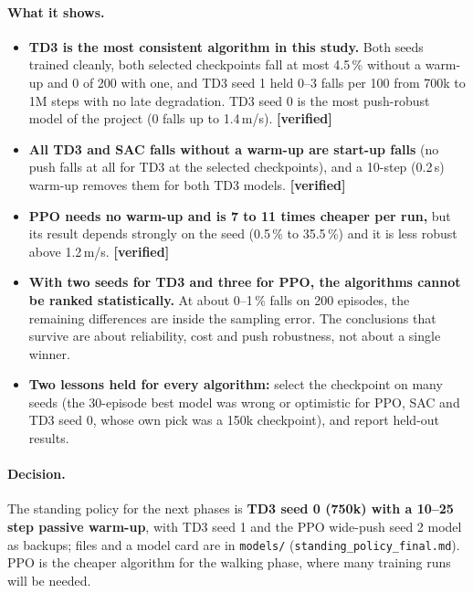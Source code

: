 \documentclass[11pt,a4paper]{article}
\newcommand{\tagv}{\textbf{[verified]}}
\begin{document}
\paragraph{What it shows.}
\begin{itemize}
\item \textbf{TD3 is the most consistent algorithm in this study.} Both seeds trained cleanly, both selected checkpoints fall at most 4.5\,\% without a warm-up and 0 of 200 with one, and TD3 seed 1 held 0--3 falls per 100 from 700k to 1M steps with no late degradation. TD3 seed 0 is the most push-robust model of the project (0 falls up to 1.4\,m/s). \tagv
\item \textbf{All TD3 and SAC falls without a warm-up are start-up falls} (no push falls at all for TD3 at the selected checkpoints), and a 10-step (0.2\,s) warm-up removes them for both TD3 models. \tagv
\item \textbf{PPO needs no warm-up and is 7 to 11 times cheaper per run,} but its result depends strongly on the seed (0.5\,\% to 35.5\,\%) and it is less robust above 1.2\,m/s. \tagv
\item \textbf{With two seeds for TD3 and three for PPO, the algorithms cannot be ranked statistically.} At about 0--1\,\% falls on 200 episodes, the remaining differences are inside the sampling error. The conclusions that survive are about reliability, cost and push robustness, not about a single winner.
\item \textbf{Two lessons held for every algorithm:} select the checkpoint on many seeds (the 30-episode best model was wrong or optimistic for PPO, SAC and TD3 seed 0, whose own pick was a 150k checkpoint), and report held-out results.
\end{itemize}
\paragraph{Decision.} The standing policy for the next phases is \textbf{TD3 seed 0 (750k) with a 10--25 step passive warm-up}, with TD3 seed 1 and the PPO wide-push seed 2 model as backups; files and a model card are in \texttt{models/} (\texttt{standing\_policy\_final.md}). PPO is the cheaper algorithm for the walking phase, where many training runs will be needed.
\end{document}
